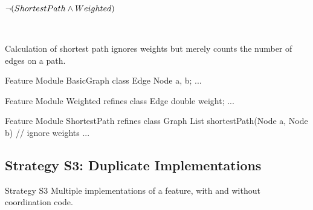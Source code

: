 \begin{frame}[fragile]{\myframetitle}
	\begin{mycolumns}[animation=none]
		\centering

		$\neg (ShortestPath \wedge Weighted)$  

		~
		\begin{note}{}
			Calculation of shortest path ignores weights but merely counts the number of edges on a path.
		\end{note}
	\mynextcolumn
\begin{codetight}{Feature Module BasicGraph}
class Edge {
	Node a, b; ...
}
\end{codetight}	
\begin{codetight}{Feature Module Weighted}
refines class Edge {
	double weight; ...
}
\end{codetight}	
\begin{codetight}{Feature Module ShortestPath}
refines class Graph {
	List shortestPath(Node a, Node b){
		// ignore weights
		... 
	}
}
\end{codetight}	
	\end{mycolumns}
\end{frame}

\subsection{Strategy S3: Duplicate Implementations}

\begin{frame}{\myframetitle}
	\begin{mycolumns}[widths={30},animation=none]
		\begin{definition}{Strategy S3}
			Multiple implementations of a feature, with and without coordination code.
		\end{definition}
	\mynextcolumn
	\end{mycolumns}
\end{frame}

